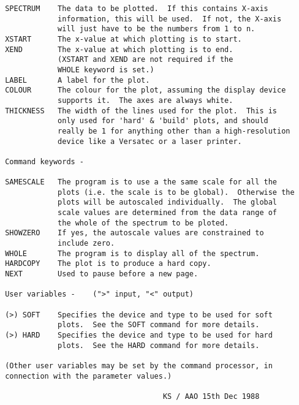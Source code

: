 \begin{description}
\begin{verbatim}
 SPECTRUM    The data to be plotted.  If this contains X-axis
             information, this will be used.  If not, the X-axis
             will just have to be the numbers from 1 to n.
 XSTART      The x-value at which plotting is to start.
 XEND        The x-value at which plotting is to end.
             (XSTART and XEND are not required if the
             WHOLE keyword is set.)
 LABEL       A label for the plot.
 COLOUR      The colour for the plot, assuming the display device
             supports it.  The axes are always white.
 THICKNESS   The width of the lines used for the plot.  This is
             only used for 'hard' & 'build' plots, and should
             really be 1 for anything other than a high-resolution
             device like a Versatec or a laser printer.

 Command keywords -

 SAMESCALE   The program is to use a the same scale for all the
             plots (i.e. the scale is to be global).  Otherwise the
             plots will be autoscaled individually.  The global
             scale values are determined from the data range of
             the whole of the spectrum to be ploted.
 SHOWZERO    If yes, the autoscale values are constrained to
             include zero.
 WHOLE       The program is to display all of the spectrum.
 HARDCOPY    The plot is to produce a hard copy.
 NEXT        Used to pause before a new page.

 User variables -    (">" input, "<" output)

 (>) SOFT    Specifies the device and type to be used for soft
             plots.  See the SOFT command for more details.
 (>) HARD    Specifies the device and type to be used for hard
             plots.  See the HARD command for more details.

 (Other user variables may be set by the command processor, in
 connection with the parameter values.)

                                     KS / AAO 15th Dec 1988
\end{verbatim}
\end{description}
